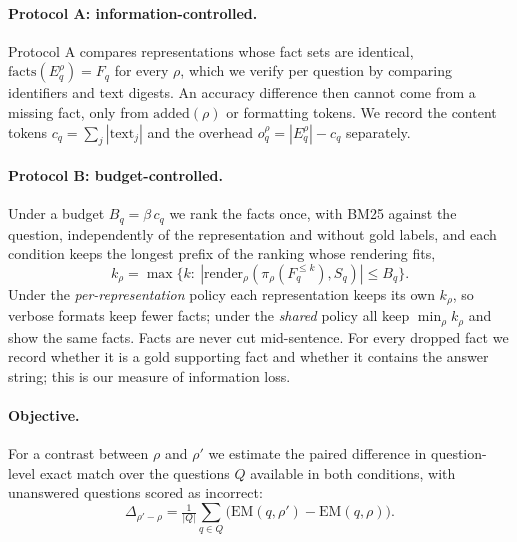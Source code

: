 \paragraph{Protocol A: information-controlled.}
Protocol A compares representations whose fact sets are identical, $\mathrm{facts}(E_q^{\rho})=F_q$ for every $\rho$, which we verify per question by comparing identifiers and text digests. An accuracy difference then cannot come from a missing fact, only from $\mathrm{added}(\rho)$ or formatting tokens. We record the content tokens $c_q=\sum_j |\mathrm{text}_j|$ and the overhead $o_q^{\rho}=|E_q^{\rho}|-c_q$ separately.

\paragraph{Protocol B: budget-controlled.}
Under a budget $B_q=\beta\, c_q$ we rank the facts once, with BM25 against the question, independently of the representation and without gold labels, and each condition keeps the longest prefix of the ranking whose rendering fits,
\begin{equation}
k_\rho=\max\{k:\ |\mathrm{render}_\rho(\pi_\rho(F_q^{\le k}),S_q)|\le B_q\}.
\end{equation}
Under the \emph{per-representation} policy each representation keeps its own $k_\rho$, so verbose formats keep fewer facts; under the \emph{shared} policy all keep $\min_\rho k_\rho$ and show the same facts. Facts are never cut mid-sentence. For every dropped fact we record whether it is a gold supporting fact and whether it contains the answer string; this is our measure of information loss.

\paragraph{Objective.}
For a contrast between $\rho$ and $\rho'$ we estimate the paired difference in question-level exact match over the questions $Q$ available in both conditions, with unanswered questions scored as incorrect:
\begin{equation}
\Delta_{\rho'\!-\!\rho}=\tfrac{1}{|Q|}\textstyle\sum_{q\in Q}\big(\mathrm{EM}(q,\rho')-\mathrm{EM}(q,\rho)\big).
\end{equation}
